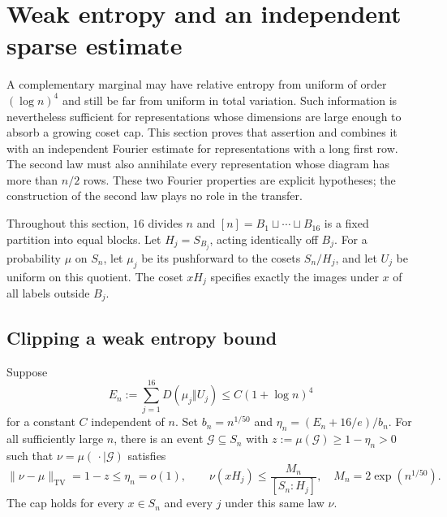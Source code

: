 \section{Weak entropy and an independent sparse estimate}
\label{l:forests}

A complementary marginal may have relative entropy from uniform of
order $(\log n)^4$ and still be far from uniform in total variation.
Such information is
nevertheless sufficient for representations whose dimensions are large
enough to absorb a growing coset cap.  This section proves that assertion
and combines it with an independent Fourier estimate for representations
with a long first row.  The second law must also annihilate every
representation whose diagram has more than $n/2$ rows.  These two
Fourier properties are explicit hypotheses; the construction of the
second law plays no role in the transfer.

Throughout this section, $16$ divides $n$ and
$[n]=B_1\sqcup\cdots\sqcup B_{16}$ is a fixed partition into equal
blocks.  Let $H_j=S_{B_j}$, acting identically off $B_j$.
For a probability $\mu$ on $S_n$, let $\mu_j$ be its pushforward to
the cosets $S_n/H_j$, and let $U_j$ be uniform on this quotient.
The coset $xH_j$ specifies exactly the images under $x$ of all labels
outside $B_j$.

\subsection{Clipping a weak entropy bound}

\begin{lemma}
\label{l:forest-clipping}
Suppose
\begin{equation}
 E_n:=\sum_{j=1}^{16}D(\mu_j\Vert U_j)
       \le C(1+\log n)^4
 \label{l:forest-entropy-hyp}
\end{equation}
for a constant $C$ independent of $n$.  Set $b_n=n^{1/50}$ and
$\eta_n=(E_n+16/e)/b_n$.  For all sufficiently large $n$, there is
an event $\mathcal G\subseteq S_n$ with
$z:=\mu(\mathcal G)\ge1-\eta_n>0$ such that
$\nu=\mu(\,\cdot\mid\mathcal G)$ satisfies
\begin{equation}
 \|\nu-\mu\|_{\mathrm{TV}}=1-z\le\eta_n=o(1),
 \qquad
 \nu(xH_j)\le\frac{M_n}{[S_n:H_j]},
 \quad M_n=2\exp(n^{1/50}).
 \label{l:forest-caps}
\end{equation}
The cap holds for every $x\in S_n$ and every $j$ under this same law
$\nu$.
\end{lemma}

